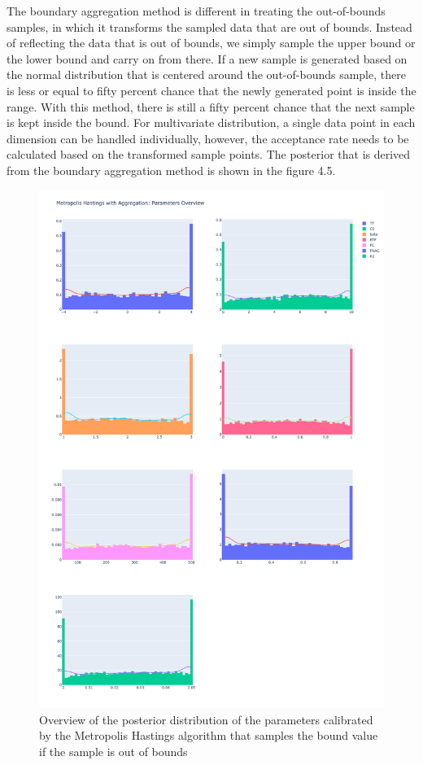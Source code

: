 The boundary aggregation method is different in treating the out-of-bounds samples, in which it transforms the sampled data that are out of bounds. Instead of reflecting the data that is out of bounds, we simply sample the upper bound or the lower bound and carry on from there. If a new sample is generated based on the normal distribution that is centered around the out-of-bounds sample, there is less or equal to fifty percent chance that the newly generated point is inside the range.\cite{gaussian_distribution_property} With this method, there is still a fifty percent chance that the next sample is kept inside the bound. For multivariate distribution, a single data point in each dimension can be handled individually, however, the acceptance rate needs to be calculated based on the transformed sample points. The posterior that is derived from the boundary aggregation method is shown in the figure 4.5.

\begin{figure}
    \centering
    \includegraphics[width=1\textwidth]{figures/basic_mh/aggr_mh/aggr_mh_parameters_overview.png}
    \captionsetup{width=.8\textwidth}
    \caption{Overview of the posterior distribution of the parameters calibrated by the Metropolis Hastings algorithm that samples the bound value if the sample is out of bounds}
    \label{fig:enter-label}
\end{figure}

